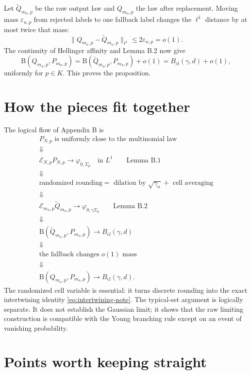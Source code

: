\documentclass[11pt]{article}
\newcommand{\B}{\mathrm B}
\newcommand{\Bcl}{B_{\mathrm{cl}}}
\begin{document}
Let $\widetilde Q_{m_n,p}$ be the raw output law and $Q_{m_n,p}$ the law
after replacement.  Moving mass $\varepsilon_{n,p}$ from rejected labels to
one fallback label changes the $\ell^1$ distance by at most twice that mass:
\[
  \|Q_{m_n,p}-\widetilde Q_{m_n,p}\|_{\ell^1}
  \leq2\varepsilon_{n,p}=o(1).
\]
The continuity of Hellinger affinity and Lemma B.2 now give
\[
  \B(Q_{m_n,p},P_{m_n,p})
  =\B(\widetilde Q_{m_n,p},P_{m_n,p})+o(1)
  =\Bcl(\gamma,d)+o(1),
\]
uniformly for $p\in K$.  This proves the proposition.

\section{How the pieces fit together}

The logical flow of Appendix B is
\[
\begin{array}{c}
P_{N,p}\text{ is uniformly close to the multinomial law}\\[1mm]
\Downarrow\\[-1mm]
\mathcal E_{N,p}P_{N,p}\to\varphi_{0,\Sigma_p}
\quad\text{in }L^1
\qquad\text{Lemma B.1}\\[1mm]
\Downarrow\\[-1mm]
\text{randomized rounding}
=\text{ dilation by }\sqrt{\gamma_n}
+\text{ cell averaging}\\[1mm]
\Downarrow\\[-1mm]
\mathcal E_{m_n,p}\widetilde Q_{m_n,p}
\to\varphi_{0,\gamma\Sigma_p}
\qquad\text{Lemma B.2}\\[1mm]
\Downarrow\\[-1mm]
\B(\widetilde Q_{m_n,p},P_{m_n,p})
\to\Bcl(\gamma,d)\\[1mm]
\Downarrow\\[-1mm]
\text{the fallback changes }o(1)\text{ mass}\\[1mm]
\Downarrow\\[-1mm]
\B(Q_{m_n,p},P_{m_n,p})\to\Bcl(\gamma,d).
\end{array}
\]
The randomized cell variable is essential: it turns discrete rounding into
the exact intertwining identity \eqref{eq:intertwining-note}.  The typical-set
argument is logically separate.  It does not establish the Gaussian limit;
it shows that the raw limiting construction is compatible with the Young
branching rule except on an event of vanishing probability.

\section{Points worth keeping straight}
\end{document}
